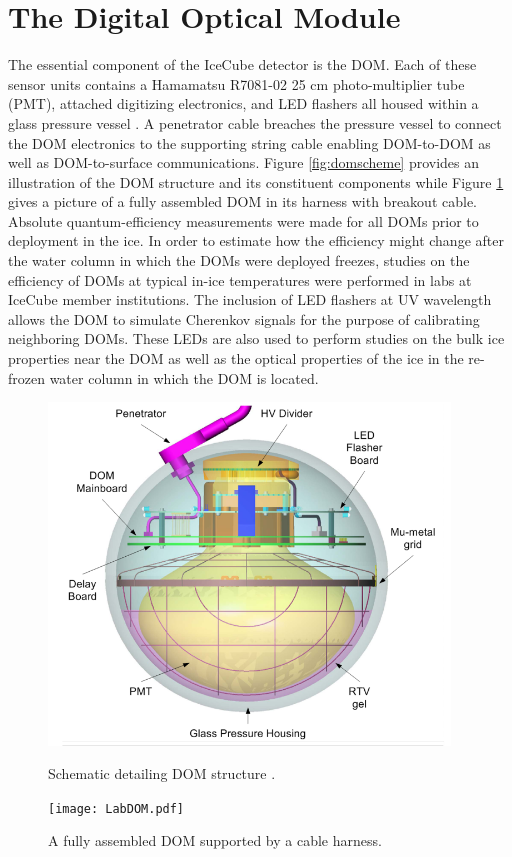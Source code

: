 \documentclass{gatech-thesis}
\begin{document}
\section{The Digital Optical Module}
The essential component of the IceCube detector is the DOM. Each of these sensor units contains a Hamamatsu R7081-02 25 cm photo-multiplier tube (PMT), attached digitizing electronics, and LED flashers all housed within a glass pressure vessel \cite{2006NIMPA.567..214H}. A penetrator cable breaches the pressure vessel to connect the DOM electronics to the supporting string cable enabling DOM-to-DOM as well as DOM-to-surface communications. Figure \ref{fig:domscheme} provides an illustration of the DOM structure and its constituent components while Figure \ref{fig:dompic} gives a picture of a fully assembled DOM in its harness with breakout cable. Absolute quantum-efficiency measurements were made for all DOMs prior to deployment in the ice. In order to estimate how the efficiency might change after the water column in which the DOMs were deployed freezes, studies on the efficiency of DOMs at typical in-ice temperatures were performed in labs at IceCube member institutions. The inclusion of LED flashers at UV wavelength allows the DOM to simulate Cherenkov signals for the purpose of calibrating neighboring DOMs. These LEDs are also used to perform studies on the bulk ice properties near the DOM as well as the optical properties of the ice in the re-frozen water column in which the DOM is located.

\begin{figure}[ht]
\centering
\begin{minipage}[b]{0.45\linewidth}
\includegraphics[width=0.95\textwidth]{DomSchematic.png}
\caption[DOM Schematic]{Schematic detailing DOM structure \cite{2009NIMPA.601..294A}.}
\label{fig:domscheme}
\end{minipage}
\quad
\begin{minipage}[b]{0.45\linewidth}
\begin{center}
\texttt{[image: LabDOM.pdf]}
\end{center}
\caption[Assembled DOM Photo]{A fully assembled DOM supported by a cable harness.}
\label{fig:dompic}
\end{minipage}
\end{figure}
\end{document}
